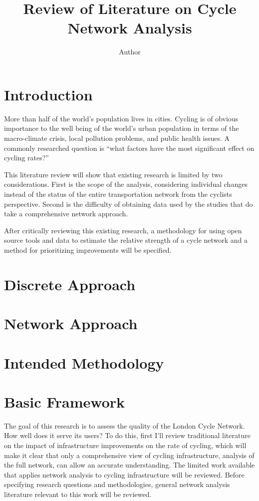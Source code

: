 \documentclass[11pt]{article} %
\title{\vspace{-3.0cm}Review of Literature on Cycle Network Analysis}
\author{Author}
\begin{document}
\maketitle

\section{Introduction}

More than half of the world's population lives in cities. Cycling is of obvious importance to the well being of the world's  urban population in terms of the macro-climate crisis, local pollution problems, and public health issues. A commonly researched question is ``what factors have the most significant effect on cycling rates?''

This literature review will show that existing research is limited by two considerations. First is the scope of the analysis, considering individual changes instead of the status of the entire transportation network from the cyclists perspective.  Second is the difficulty of obtaining data used by the studies that do take a comprehensive network approach. 

After critically reviewing this existing research, a methodology for using open source tools and data to estimate the relative strength of a cycle network and a method for prioritizing improvements will be specified. 

\section{Discrete Approach}

\section{Network Approach}

\section{Intended Methodology}







\section{Basic Framework}

The goal of this research is to assess the quality of the London Cycle Network. How well does it serve its users? To do this, first I'll review traditional literature on the impact of infrastructure improvements on the rate of cycling, which will make it clear that only a comprehensive view of cycling infrastructure, analysis of the full network, can allow an accurate understanding. The limited work available that applies network analysis to cycling infrastructure will be reviewed. Before specifying research questions and methodologies, general network analysis literature relevant to this work will be reviewed. 
\end{document}
